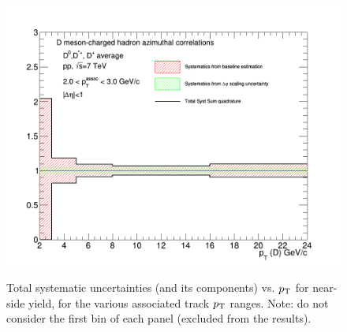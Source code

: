 \begin{figure}[!htbp]
{\includegraphics[width=0.48\linewidth, height=0.33\linewidth]{figures/FitOutput/TotalSystematicSourcesNSYield_pthad2to3.png}}
\caption{Total systematic uncertainties (and its components) vs. $p_{\rm T}$ for near-side yield, for the various associated track $p_{\rm T}$ ranges. Note: do not consider the first bin of each panel (excluded from the results).}
\label{fig:NSyieldTotalUnc}
\end{figure}
